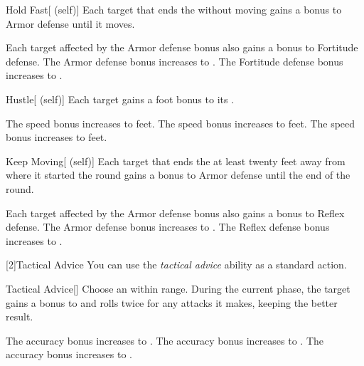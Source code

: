 {            \begin{attuneability}{Hold Fast}[ (self)]
                Each target that ends the  without moving gains a  bonus to Armor defense until it moves.

                \rankline
                 Each target affected by the Armor defense bonus also gains a  bonus to Fortitude defense.
                 The Armor defense bonus increases to .
                 The Fortitude defense bonus increases to .
            \end{attuneability}

            \begin{attuneability}{Hustle}[ (self)]
                Each target gains a  foot bonus to its .

                \rankline
                 The speed bonus increases to  feet.
                 The speed bonus increases to  feet.
                 The speed bonus increases to  feet.
            \end{attuneability}

            \begin{attuneability}{Keep Moving}[ (self)]
                Each target that ends the  at least twenty feet away from where it started the round gains a  bonus to Armor defense until the end of the round.

                \rankline
                 Each target affected by the Armor defense bonus also gains a  bonus to Reflex defense.
                 The Armor defense bonus increases to .
                 The Reflex defense bonus increases to .
            \end{attuneability}
        }

        [2]{Tactical Advice} You can use the \textit{tactical advice} ability as a standard action.
        \begin{freeability}{Tactical Advice}[]
            Choose an  within \rngmed range.
            During the current phase, the target gains a  bonus to  and rolls twice for any attacks it makes, keeping the better result.

            \rankline
             The accuracy bonus increases to .
             The accuracy bonus increases to .
             The accuracy bonus increases to .
        \end{freeability}

